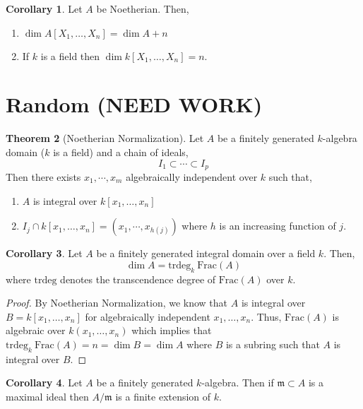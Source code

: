 \documentclass[12pt]{article}
\newcommand{\Frac}[1]{\mathrm{Frac}\left(#1\right)}
\newcommand{\m}{\mathfrak{m}}
\theoremstyle{remark}
\theoremstyle{definition}
\newtheorem{theorem}{Theorem}[section]
\newtheorem{corollary}[theorem]{Corollary}
\begin{document}
\begin{corollary}
Let $A$ be Noetherian. Then,
\begin{enumerate}
\item $\dim{A[X_1, \dots, X_n]} = \dim{A} + n$ 
\item If $k$ is a field then $\dim{k[X_1, \dots, X_n]} = n$.
\end{enumerate}
\end{corollary}


\section{Random (NEED WORK)}

\begin{theorem}[Noetherian Normalization]
Let $A$ be a finitely generated $k$-algebra domain ($k$ is a field) and a chain of ideals,
\[ I_1 \subset \cdots \subset I_p \]
Then there exists $x_1, \cdots, x_m$ algebraically independent over $k$ such that,
\begin{enumerate}
\item
$A$ is integral over $k[x_1, \dots, x_n]$
\item $I_j \cap k[x_1, \dots, x_n] = (x_1, \cdots, x_{h(j)})$ where $h$ is an increasing function of $j$. 
\end{enumerate}
\end{theorem}

\newcommand{\trdeg}[2]{\mathrm{trdeg}_{#1} \: #2}

\begin{corollary}
Let $A$ be a finitely generated integral domain over a field $k$. Then,
\[ \dim{A} = \trdeg{k}{\Frac{A}} \]
where $\mathrm{trdeg}$ denotes the transcendence degree of $\Frac{A}$ over $k$. 
\end{corollary}

\begin{proof}
By Noetherian Normalization, we know that $A$ is integral over $B = k[x_1, \dots, x_n]$ for algebraically independent $x_1, \dots, x_n$. Thus, $\Frac{A}$ is algebraic over $k(x_1, \dots, x_n)$ which implies that $\trdeg{k}{\Frac{A}} = n = \dim{B} = \dim{A}$ where $B$ is a subring such that $A$ is integral over $B$.  
\end{proof}

\begin{corollary}
Let $A$ be a finitely generated $k$-algebra. Then if $\m \subset A$ is a maximal ideal then $A / \m$ is a finite extension of $k$.
\end{corollary}
\end{document}
